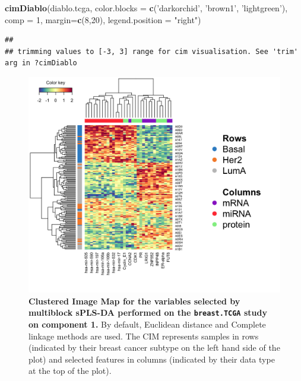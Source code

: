 \documentclass[]{book}
\newenvironment{Shaded}{\begin{snugshade}}{\end{snugshade}}
\newcommand{\KeywordTok}[1]{\textcolor[rgb]{0.13,0.29,0.53}{\textbf{#1}}}
\newcommand{\DataTypeTok}[1]{\textcolor[rgb]{0.13,0.29,0.53}{#1}}
\newcommand{\DecValTok}[1]{\textcolor[rgb]{0.00,0.00,0.81}{#1}}
\newcommand{\StringTok}[1]{\textcolor[rgb]{0.31,0.60,0.02}{#1}}
\newcommand{\NormalTok}[1]{#1}
\begin{document}
\begin{Shaded}
\begin{Highlighting}[]
\KeywordTok{cimDiablo}\NormalTok{(diablo.tcga, }\DataTypeTok{color.blocks =} \KeywordTok{c}\NormalTok{(}\StringTok{'darkorchid'}\NormalTok{, }\StringTok{'brown1'}\NormalTok{, }\StringTok{'lightgreen'}\NormalTok{),}
          \DataTypeTok{comp =} \DecValTok{1}\NormalTok{, }\DataTypeTok{margin=}\KeywordTok{c}\NormalTok{(}\DecValTok{8}\NormalTok{,}\DecValTok{20}\NormalTok{), }\DataTypeTok{legend.position =} \StringTok{"right"}\NormalTok{)}
\end{Highlighting}
\end{Shaded}

\begin{verbatim}
## 
## trimming values to [-3, 3] range for cim visualisation. See 'trim' arg in ?cimDiablo
\end{verbatim}

\begin{figure}

{\centering \includegraphics[width=0.7\linewidth]{Figures/DIABLO/diablo-cim-1} 

}

\caption{\textbf{Clustered Image Map for the variables selected
by multiblock sPLS-DA performed on the \texttt{breast.TCGA} study on
component 1.} By default, Euclidean distance and Complete linkage
methods are used. The CIM represents samples in rows (indicated by their
breast cancer subtype on the left hand side of the plot) and selected
features in columns (indicated by their data type at the top of the
plot).}\label{fig:diablo-cim}
\end{figure}
\end{document}
